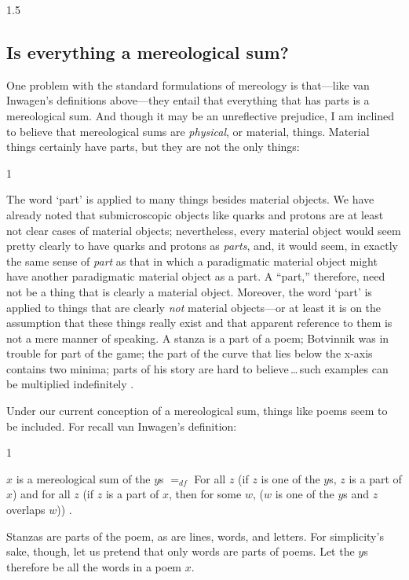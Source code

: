 \documentclass[11pt]{article}
\newenvironment{squote}{%
\begin{spacing}{1}
\begin{list}{}{%
\setlength{\labelwidth}{0pt}%
\rightmargin\leftmargin%
}
\item\relax
}{%
\end{list}%
\end{spacing}
}
\begin{document}
\begin{spacing}{1.5}
\subsection{Is everything a mereological sum?}
\label{all-sum}
One problem with the standard formulations of mereology is that---like
van Inwagen's definitions above---they entail that everything that has
parts is a mereological sum.  And though it may be an unreflective
prejudice, I am inclined to believe that mereological sums are {\em
  physical}, or material, things.  Material things certainly have
parts, but they are not the only things:

\begin{squote}
The word `part' is applied to many things besides material objects.
We have already noted that submicroscopic objects like quarks and
protons are at least not clear cases of material objects;
nevertheless, every material object would seem pretty clearly to have
quarks and protons as \emph{parts}, and, it would seem, in exactly the
same sense of \emph{part} as that in which a paradigmatic material
object might have another paradigmatic material object as a part.  A
``part,'' therefore, need not be a thing that is clearly a material
object.  Moreover, the word `part' is applied to things that are
clearly \emph{not} material objects---or at least it is on the
assumption that these things really exist and that apparent reference
to them is not a mere manner of speaking.  A stanza is a part of a
poem; Botvinnik was in trouble for part of the game; the part of the
curve that lies below the x-axis contains two minima; parts of his
story are hard to believe\,\ldots\,such examples can be multiplied
indefinitely \citeyearpar[18--19]{inwagen1995}.
\end{squote}

Under our current conception of a mereological sum, things like poems
seem to be included.  For recall van Inwagen's definition:

\begin{squote}
$x$ is a mereological sum of the $y$s $=_{df}$ For all $z$ (if $z$ is
  one of the $y$s, $z$ is a part of $x$) and for all $z$ (if $z$ is a
  part of $x$, then for some $w$, ($w$ is one of the $y$s and $z$
  overlaps $w$)) \citeyearpar[618--619]{inwagen2006}.
\end{squote}

Stanzas are parts of the poem, as are lines, words, and letters.  For
simplicity's sake, though, let us pretend that only words are parts of
poems.  Let the $y$s therefore be all the words in a poem $x$.


\end{spacing}
\end{document}
